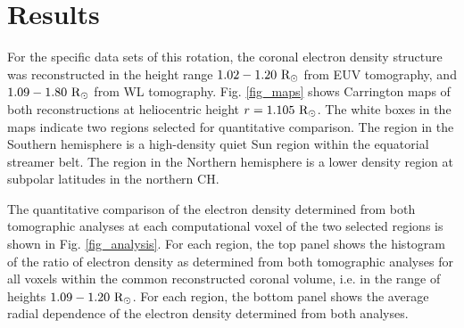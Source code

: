 \documentclass[baaa]{baaa}
\begin{document}
\section{Results}

For the specific data sets of this rotation, the coronal electron density structure was reconstructed in the height range $1.02-1.20~\rm{R}_\odot$ from EUV tomography, and $1.09-1.80~\rm{R}_\odot$ from WL tomography. Fig. \ref{fig_maps} shows Carrington maps of both reconstructions at heliocentric height $r=1.105~\rm{R}_\odot$. The white boxes in the maps indicate two regions selected for quantitative comparison. The region in the Southern hemisphere is a high-density quiet Sun region within the equatorial streamer belt. The region in the Northern hemisphere is a lower density region at subpolar latitudes in the northern CH.

The quantitative comparison of the electron density determined from both tomographic {analyses} at each computational voxel of the two selected regions is shown in Fig. \ref{fig_analysis}. For each region, the top panel shows the histogram of the ratio of electron density as determined from both tomographic {analyses} for all voxels within the common reconstructed coronal volume, i.e. in the range of heights $1.09-1.20~\rm{R}_\odot$.
For each region, the bottom panel shows the average radial dependence of the electron density determined from both {analyses}.
\end{document}
